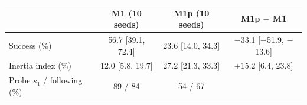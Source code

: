 \begin{tabular}{lccc}
\toprule
 & M1 (10 seeds) & M1p (10 seeds) & M1p $-$ M1 \\
\midrule
Success (\%) & 56.7 [39.1, 72.4] & 23.6 [14.0, 34.3] & $-$33.1 [$-$51.9, $-$13.6] \\
Inertia index (\%) & 12.0 [5.8, 19.7] & 27.2 [21.3, 33.3] & +15.2 [6.4, 23.8] \\
Probe $s_1$ / following (\%) & 89 / 84 & 54 / 67 &  \\
\bottomrule
\end{tabular}
